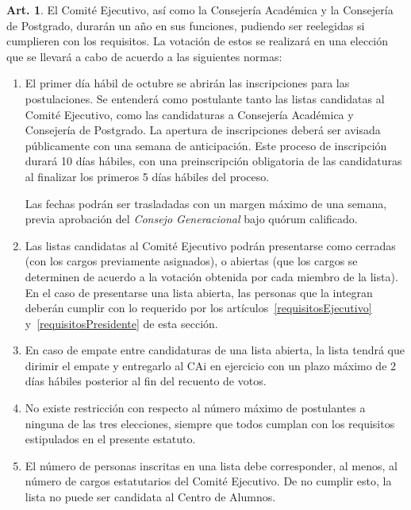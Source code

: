 \documentclass[letterpaper,11pt]{article}
\theoremstyle{definition}%
\newtheorem{art}{Art.} %
\begin{document}
\begin{art}\label{eleccionesCAi}
	El Comité Ejecutivo, así como la Consejería Académica y la Consejería de Postgrado, durarán un año en sus funciones, pudiendo ser reelegidas si cumplieren con los requisitos. La votación de estos se realizará en una elección que se llevará a cabo de acuerdo a las siguientes normas:
	\begin{enumerate}
		\item El primer día hábil de octubre se abrirán las inscripciones para las postulaciones. Se entenderá como postulante tanto las listas candidatas al Comité Ejecutivo, como las candidaturas a Consejería Académica y Consejería de Postgrado. La apertura de inscripciones deberá ser avisada públicamente con una semana de anticipación. Este proceso de inscripción durará 10 días hábiles, con una preinscripción obligatoria de las candidaturas al finalizar los primeros 5 días hábiles del proceso.

		      Las fechas podrán ser trasladadas con un margen máximo de una semana, previa aprobación del \emph{Consejo Generacional} bajo quórum calificado.

		\item Las listas candidatas al Comité Ejecutivo podrán presentarse como cerradas (con los cargos previamente asignados), o abiertas (que los cargos se determinen de acuerdo a la votación obtenida por cada miembro de la lista). En el caso de presentarse una lista abierta, las personas que la integran deberán cumplir con lo requerido por los artículos~\ref{requisitosEjecutivo} y~\ref{requisitosPresidente} de esta sección.

		\item En caso de empate entre candidaturas de una lista abierta, la lista tendrá que dirimir el empate y entregarlo al CAi en ejercicio con un plazo máximo de 2 días hábiles posterior al fin del recuento de votos.

		\item No existe restricción con respecto al número máximo de postulantes a ninguna de las tres elecciones, siempre que todos cumplan con los requisitos estipulados en el presente estatuto.

		\item El número de personas inscritas en una lista debe corresponder, al menos, al número de cargos estatutarios del Comité Ejecutivo. De no cumplir esto, la lista no puede ser candidata al Centro de Alumnos.


\end{enumerate}
\end{art}
\end{document}
